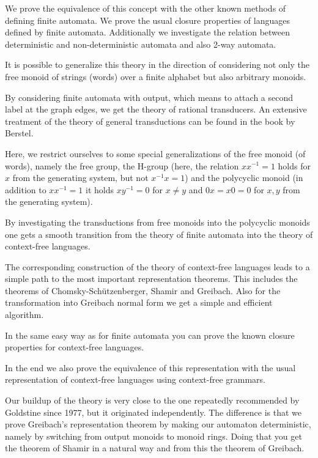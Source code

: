 We prove the equivalence of this concept with the other known methods of
defining finite automata. We prove the usual closure properties of languages
defined by finite automata. Additionally we investigate the relation between
deterministic and non-deterministic automata and also 2-way automata.

It is possible to generalize this theory in the direction of considering not
only the free monoid of strings (words) over a finite alphabet but also
arbitrary monoids.

By considering finite automata with output, which means to attach a second label
at the graph edges, we get the theory of rational transducers. An extensive
treatment of the theory of general transductions can be found in the book by
Berstel.

Here, we restrict ourselves to some special generalizations of the free monoid
(of words), namely the free group, the H-group (here, the relation $x x^{-1} =
1$ holds for $x$ from the generating system, but not $x^{-1} x = 1$) and the
polycyclic monoid (in addition to $x x^{-1} = 1$ it holds $x y^{-1} = 0$ for
$x \neq y$ and $0 x = x 0 = 0$ for $x,y$ from the generating system).

By investigating the transductions from free monoids into the polycyclic
monoids one gets a smooth transition from the theory of finite automata into the
theory of context-free languages.

The corresponding construction of the theory of context-free languages leads to
a simple path to the most important representation theorems. This includes the
theorems of Chomsky-Schützenberger, Shamir and Greibach. Also for the
transformation into Greibach normal form we get a simple and efficient
algorithm.

In the same easy way as for finite automata you can prove the known closure
properties for context-free languages.

In the end we also prove the equivalence of this representation with the usual
representation of context-free languages using context-free grammars.

Our buildup of the theory is very close to the one repeatedly recommended by
Goldstine since 1977, but it originated independently. The difference is that we
prove Greibach's representation theorem by making our automaton deterministic,
namely by switching from output monoids to monoid rings. Doing that you get the
theorem of Shamir in a natural way and from this the theorem of Greibach.

